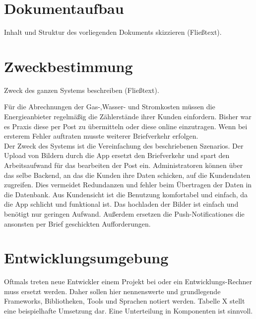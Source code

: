 \section{Dokumentaufbau}\label{sec:dokumentaufbau}
\begin{tcolorbox}
	Inhalt und Struktur des vorliegenden Dokuments skizzieren (Fließtext).
\end{tcolorbox}

\section{Zweckbestimmung}\label{sec:zweckbestimmung}
\begin{tcolorbox}
	Zweck des ganzen Systems beschreiben (Fließtext).
\end{tcolorbox}
Für die Abrechnungen der Gas-,Wasser- und Stromkosten müssen die Energieanbieter regelmäßig die Zählerstände ihrer
Kunden einfordern. Bisher war es Praxis diese per Post zu übermitteln oder diese online einzutragen. Wenn bei ersterem Fehler auftraten musste weiterer Briefverkehr erfolgen.\\
Der Zweck des Systems ist die Vereinfachung des beschriebenen Szenarios. Der Upload von Bildern durch die App ersetzt den Briefverkehr und spart den Arbeitsaufwand für das bearbeiten der Post ein. Administratoren können über das selbe Backend, an das die Kunden ihre Daten schicken, auf die Kundendaten zugreifen. Dies vermeidet Redundanzen und fehler beim Übertragen der Daten in die Datenbank.
Aus Kundensicht ist die Benutzung komfortabel und einfach, da die App schlicht und funktional ist. Das hochladen der Bilder ist einfach und benötigt nur geringen Aufwand. Außerdem ersetzen die Push-Notificationes die ansonsten per Brief geschickten Aufforderungen.


\section{Entwicklungsumgebung}\label{sec:entwicklungsumgebung}
\begin{tcolorbox}
	Oftmals treten neue Entwickler einem Projekt bei oder ein Entwicklungs-Rechner muss ersetzt werden.
	Daher sollen hier nennenswerte und grundlegende Frameworks, Bibliotheken, Tools und Sprachen notiert werden.
	Tabelle X stellt eine beispielhafte Umsetzung dar.
	Eine Unterteilung in Komponenten ist sinnvoll.
\end{tcolorbox}

